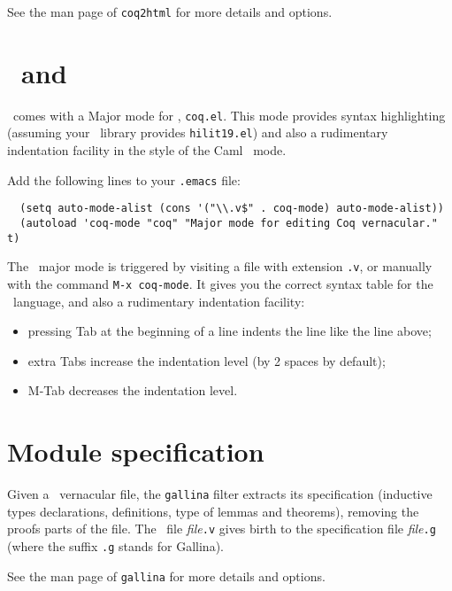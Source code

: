 See the man page of {\tt coq2html} for more details and options.


\section{\Coq\ and \emacs}\label{Emacs}

\Coq\ comes with a Major mode for \emacs, {\tt coq.el}. This mode provides
syntax highlighting (assuming your \emacs\ library provides
{\tt hilit19.el}) and also a rudimentary indentation facility
in the style of the Caml \emacs\ mode.

Add the following lines to your \verb!.emacs! file:

\begin{verbatim}
  (setq auto-mode-alist (cons '("\\.v$" . coq-mode) auto-mode-alist))
  (autoload 'coq-mode "coq" "Major mode for editing Coq vernacular." t)
\end{verbatim}

The \Coq\ major mode is triggered by visiting a file with extension {\tt .v},
or manually with the command \verb!M-x coq-mode!.
It gives you the correct syntax table for
the \Coq\ language, and also a rudimentary indentation facility:
\begin{itemize}
  \item pressing {\sc Tab} at the beginning of a line indents the line like
    the line above;

  \item extra {\sc Tab}s increase the indentation level
    (by 2 spaces by default);

  \item M-{\sc Tab} decreases the indentation level.
\end{itemize}


\section{Module specification}\label{gallina}

Given a \Coq\ vernacular file, the {\tt gallina} filter extracts its
specification (inductive types declarations, definitions, type of
lemmas and theorems), removing the proofs parts of the file. The \Coq\
file {\em file}{\tt.v} gives birth to the specification file
{\em file}{\tt.g} (where the suffix {\tt.g} stands for {\sf Gallina}).

See the man page of {\tt gallina} for more details and options.


